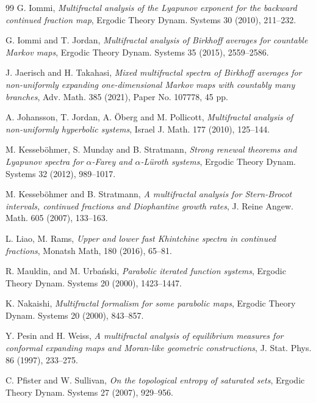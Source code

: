 \documentclass[12pt,reqno]{amsart}
\renewcommand{\=}{\coloneqq}
\theoremstyle{plain}
\begin{document}
\begin{thebibliography}{99}
 G. Iommi, {\it Multifractal analysis of the Lyapunov exponent for the backward continued fraction map}, Ergodic Theory Dynam. Systems 30 (2010), 211--232.



 G. Iommi and  T. Jordan, {\it Multifractal analysis of Birkhoff averages for countable Markov maps}, Ergodic Theory Dynam. Systems 35 (2015), 2559--2586.


 J. Jaerisch and H. Takahasi, {\it Mixed multifractal spectra of Birkhoff averages for non-uniformly expanding one-dimensional Markov maps with countably many branches}, Adv. Math. 385 (2021), Paper No. 107778, 45 pp.



 A. Johansson, T. Jordan, A. \"{O}berg and M. Pollicott, {\it Multifractal analysis of non-uniformly hyperbolic systems}, Israel J. Math. 177 (2010), 125--144.






 M. Kesseb\"{o}hmer, S. Munday and B. Stratmann, {\it Strong renewal theorems and Lyapunov spectra for $\alpha$-Farey and $\alpha$-L\"{u}roth systems}, Ergodic Theory Dynam. Systems 32 (2012), 989--1017.

 M. Kesseb\"{o}hmer and B. Stratmann, {\it A multifractal analysis for Stern-Brocot intervals, continued fractions and Diophantine growth rates}, J. Reine Angew. Math. 605 (2007), 133--163.





 L. Liao, M. Rams, {\it Upper and lower fast Khintchine spectra in continued fractions}, Monatsh Math, 180 (2016), 65--81.


 R. Mauldin, and M. Urba\'{n}ski, {\it Parabolic iterated function systems}, Ergodic Theory Dynam. Systems 20 (2000), 1423--1447.


 K. Nakaishi, {\it Multifractal formalism for some parabolic maps}, Ergodic Theory Dynam. Systems 20 (2000), 843--857.



 Y. Pesin and H. Weiss, {\it A multifractal analysis of equilibrium measures for conformal expanding maps and Moran-like geometric constructions}, J. Stat. Phys. 86 (1997), 233--275.



 C. Pfister and W. Sullivan, {\it On the topological entropy of saturated sets}, Ergodic Theory Dynam. Systems 27 (2007), 929--956.




\end{thebibliography}
\end{document}
